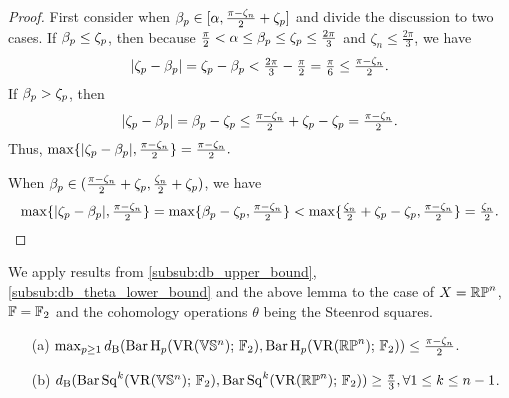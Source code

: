 \begin{proof}
        First consider when $\beta_p \in [\alpha, \tfrac{\pi - \zeta_n}{2}+\zeta_p]$ and divide the discussion to two cases.  
        If $\beta_p \leq \zeta_p$, then because $\tfrac{\pi}{2} < \alpha \leq \beta_p \leq \zeta_p  \leq \tfrac{2\pi}{3}$ and $\zeta_n \leq \tfrac{2\pi}{3}$, we have
        \[
            |\zeta_p  - \beta_p | 
            = \zeta_p  - \beta_p  
            < \tfrac{2\pi}{3} - \tfrac{\pi}{2} 
            = \tfrac{\pi}{6} 
            \leq \tfrac{\pi - \zeta_n}{2}.
        \]
        If $\beta_p > \zeta_p$, then 
        \[
            |\zeta_p  - \beta_p | 
            = \beta_p - \zeta_p
            \leq \tfrac{\pi - \zeta_n}{2} + \zeta_p - \zeta_p 
            = \tfrac{\pi - \zeta_n}{2}.
        \]
        Thus, $\max\{|\zeta_p  - \beta_p |, \tfrac{\pi - \zeta_n}{2}\} = \tfrac{\pi - \zeta_n}{2}.$
        
        When $\beta_p \in (\tfrac{\pi - \zeta_n}{2}+\zeta_p, \tfrac{\zeta_n}{2}+\zeta_p)$, we have
        \[
            \max\{|\zeta_p  - \beta_p |, \tfrac{\pi - \zeta_n}{2}\}
            = \max\{\beta_p - \zeta_p, \tfrac{\pi - \zeta_n}{2}\}
            < \max\{\tfrac{\zeta_n}{2}+\zeta_p - \zeta_p, \tfrac{\pi - \zeta_n}{2}\}
            = \tfrac{\zeta_n}{2} .
        \]
\end{proof}

We apply results from \cref{subsub:db_upper_bound}, \cref{subsub:db_theta_lower_bound} and the above lemma to the case of $X = \mathbb{RP}^n$, $\mathbb{F} = {\mathbb{F}_2}$ and the cohomology operations $\theta$ being the Steenrod squares.

\medskip\theorem
\begin{itemize} 
	\item[(a)] $\max_{p\geq 1}d_{\mathrm{B}}(\operatorname{Bar} \operatorname{H}_{p}(\operatorname{VR}(\mathbb{V}\mathbb{S}^n);\,{\mathbb{F}_2}), \operatorname{Bar} \operatorname{H}_{p}(\operatorname{VR}(\mathbb{RP}^n);\,{\mathbb{F}_2}))\leq \tfrac{\pi - \zeta_n}{2}$.
	\smallskip\item[(b)] $d_{\mathrm{B}}(\operatorname{Bar}\operatorname{Sq}^{k}(\operatorname{VR}(\mathbb{V}\mathbb{S}^n);\,{\mathbb{F}_2}), \operatorname{Bar}\operatorname{Sq}^{k}(\operatorname{VR}(\mathbb{RP}^n);\,{\mathbb{F}_2}))\geq \tfrac{\pi}{3},\forall 1\leq k\leq n-1$.
\end{itemize}

